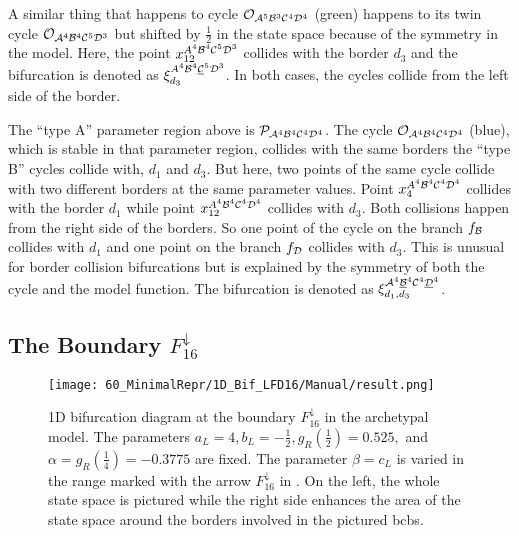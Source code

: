 A similar thing that happens to cycle $\mathcal{O}_{\mathcal{A}^5\mathcal{B}^3\mathcal{C}^4\mathcal{D}^4}$ (green) happens to its twin cycle $\mathcal{O}_{\mathcal{A}^4\mathcal{B}^4\mathcal{C}^5\mathcal{D}^3}$ but shifted by $\frac{1}{2}$ in the state space because of the symmetry in the model.
Here, the point $x_{12}^{A^4\mathcal{B}^4\mathcal{C}^5\mathcal{D}^3}$ collides with the border $d_3$ and the bifurcation is denoted as $\xi_{d_3}^{A^4\mathcal{B}^4\underline{\mathcal{C}}^5\mathcal{D}^3}$.
In both cases, the cycles collide from the left side of the border.

The ``type A'' parameter region above is $\mathcal{P}_{\mathcal{A}^4\mathcal{B}^4\mathcal{C}^4\mathcal{D}^4}$.
The cycle $\mathcal{O}_{\mathcal{A}^4\mathcal{B}^4\mathcal{C}^4\mathcal{D}^4}$ (blue), which is stable in that parameter region, collides with the same borders the ``type B'' cycles collide with, $d_1$ and $d_3$.
But here, two points of the same cycle collide with two different borders at the same parameter values.
Point $x_{4}^{A^4\mathcal{B}^4\mathcal{C}^4\mathcal{D}^4}$ collides with the border $d_1$ while point $x_{12}^{A^4\mathcal{B}^4\mathcal{C}^4\mathcal{D}^4}$ collides with $d_3$.
Both collisions happen from the right side of the borders.
So one point of the cycle on the branch $f_{\mathcal{B}}$ collides with $d_1$ and one point on the branch $f_{\mathcal{D}}$ collides with $d_3$.
This is unusual for border collision bifurcations but is explained by the symmetry of both the cycle and the model function.
The bifurcation is denoted as $\xi_{d_1, d_3}^{\mathcal{A}^4\underline{\mathcal{B}}^4\mathcal{C}^4\underline{\mathcal{D}}^4}$.

\subsection{The Boundary $F_{16}^\downarrow$}
\label{sec:arch.bif.D}

\begin{figure}
	\centering
	\texttt{[image: 60\_MinimalRepr/1D\_Bif\_LFD16/Manual/result.png]}
	\caption[1D bifurcation diagram at the boundary $F_{16}^\downarrow$ in the archetypal model]{
		1D bifurcation diagram at the boundary $F_{16}^\downarrow$ in the archetypal model.
		The parameters $a_L = 4, b_L = -\frac{1}{2}, g_R\left(\frac{1}{2}\right) = 0.525,$ and $\alpha = g_R\left(\frac{1}{4}\right) = -0.3775$ are fixed.
		The parameter $\beta = c_L$ is varied in the range marked with the arrow $F_{16}^\downarrow$ in .
		On the left, the whole state space is pictured while the right side enhances the area of the state space around the borders involved in the pictured \glspl{bcb}.
	}
	\label{fig:arch.bif.F.down}
\end{figure}

